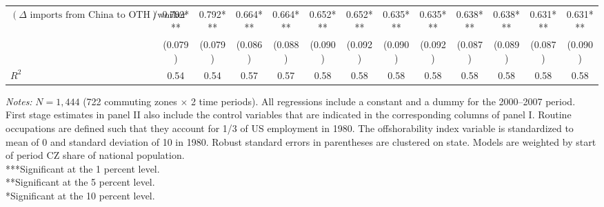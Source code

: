 \begin{frame}
\begin{table}[ht]
{\begin{tabular}{lcccccccccccc}
$(\Delta \text{ imports from China to OTH})/\text{worker}$  
                & 0.792***    & 0.792***   & 0.664***    & 0.664***   & 0.652***    & 0.652***   & 0.635***    & 0.635***   & 0.638***    & 0.638***   & 0.631***    & 0.631***   \\
                & (0.079)     & (0.079)    & (0.086)     & (0.088)    & (0.090)     & (0.092)    & (0.090)     & (0.092)    & (0.087)     & (0.089)    & (0.087)     & (0.090)    \\
$R^2$          
                & 0.54        & 0.54       & 0.57        & 0.57       & 0.58        & 0.58       & 0.58        & 0.58       & 0.58        & 0.58       & 0.58        & 0.58       \\
                \bottomrule
            \end{tabular}
        }
        \vspace{0.2cm}
        
        \begin{minipage}{\linewidth}
            \tiny
            \textit{Notes:} $N = 1,444$ (722 commuting zones $\times$ 2 time periods). All regressions include a constant and a dummy for the 2000--2007 period. First stage estimates in panel II also include the control variables that are indicated in the corresponding columns of panel I. Routine occupations are defined such that they account for 1/3 of US employment in 1980. The offshorability index variable is standardized to mean of 0 and standard deviation of 10 in 1980. Robust standard errors in parentheses are clustered on state. Models are weighted by start of period CZ share of national population. \\
            ***Significant at the 1 percent level. \\
            **Significant at the 5 percent level. \\
            *Significant at the 10 percent level.
        \end{minipage}
    \end{table}
\end{frame}

